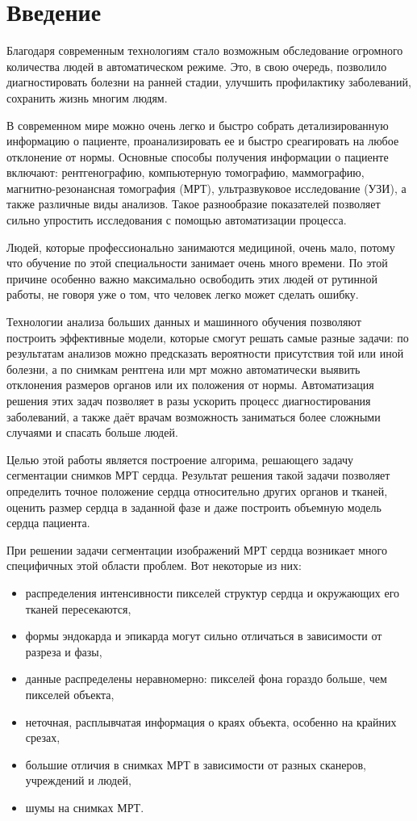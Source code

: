 \section{Введение}

Благодаря современным технологиям стало возможным обследование огромного количества людей в автоматическом режиме. Это, в свою очередь, позволило диагностировать болезни на ранней стадии, улучшить профилактику заболеваний, сохранить жизнь многим людям.

В современном мире можно очень легко и быстро собрать детализированную информацию о пациенте, проанализировать ее и быстро среагировать на любое отклонение от нормы. Основные способы получения информации о пациенте включают: рентгенографию, компьютерную томографию, маммографию, магнитно-резонансная томография (МРТ), ультразвуковое исследование (УЗИ), а также различные виды анализов. Такое разнообразие показателей позволяет сильно упростить исследования с помощью автоматизации процесса.

Людей, которые профессионально занимаются медициной, очень мало, потому что обучение по этой специальности занимает очень много времени. По этой причине особенно важно максимально освободить этих людей от рутинной работы, не говоря уже о том, что человек легко может сделать ошибку.

Технологии анализа больших данных и машинного обучения позволяют построить эффективные модели, которые смогут решать самые разные задачи: по результатам анализов можно предсказать вероятности присутствия той или иной болезни, а по снимкам рентгена или мрт можно автоматически выявить отклонения размеров органов или их положения от нормы. Автоматизация решения этих задач позволяет в разы ускорить процесс диагностирования заболеваний, а также даёт врачам возможность заниматься более сложными случаями и спасать больше людей.

Целью этой работы является построение алгорима, решающего задачу сегментации снимков МРТ сердца. Результат решения такой задачи позволяет определить точное положение сердца относительно других органов и тканей, оценить размер сердца в заданной фазе и даже построить объемную модель сердца пациента.

При решении задачи сегментации изображений МРТ сердца возникает много специфичных этой области проблем. Вот некоторые из них:

\begin{itemize}
  \item распределения интенсивности пикселей структур сердца и окружающих его тканей пересекаются,
  \item формы эндокарда и эпикарда могут сильно отличаться в зависимости от разреза и фазы,
  \item данные распределены неравномерно: пикселей фона гораздо больше, чем пикселей объекта,
  \item неточная, расплывчатая информация о краях объекта, особенно на крайних срезах,
  \item большие отличия в снимках МРТ в зависимости от разных сканеров, учреждений и людей,
  \item шумы на снимках МРТ.
\end{itemize}

